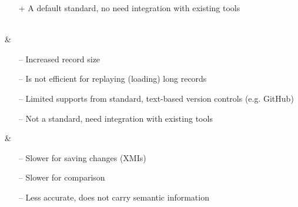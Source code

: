\begin{table*}[h]
\begin{scriptsize}
\begin{tabular}
\begin{minipage}[t]{5cm}
\begin{itemize}[leftmargin=9pt]
          \item[+] A default standard, no need integration with existing tools \cite{koegel2010emfstore}  
        \end{itemize}
      \end{minipage}
      \\
      \hline
       & \begin{minipage}[t]{5cm}
        \raggedright
        \begin{itemize}[leftmargin=9pt]
          \setlength\itemsep{2pt}
          \item[--] Increased record size \cite{DBLP:journals/entcs/RobbesL07,DBLP:conf/edoc/KoegelHLHD10}
          \item[--] Is not efficient for replaying (loading) long records \cite{mens2002state}
          \item[--] Limited supports from standard, text-based version controls (e.g. GitHub) \cite{koegel2010emfstore} 
          \item[--] Not a standard, need integration with existing tools \cite{koegel2010emfstore} 
        \end{itemize}
      \end{minipage}
      & 
      \begin{minipage}[t]{5cm}
        \raggedright
        \begin{itemize}[leftmargin=9pt]
          \setlength\itemsep{2pt}
          \item[--] Slower for saving changes (XMIs)  \cite{mens2002state,daniel2016neoemf,DBLP:conf/models/Espinazo-PaganCM11}
          \item[--] Slower for comparison \cite{DBLP:conf/edoc/KoegelHLHD10}
          \item[--] Less accurate, does not carry semantic information \cite{mens2002state,DBLP:conf/edoc/KoegelHLHD10}  
        \end{itemize}
      \end{minipage}
      \\
      \hline
    \end{tabular} 
  \end{scriptsize}
\end{table*}

